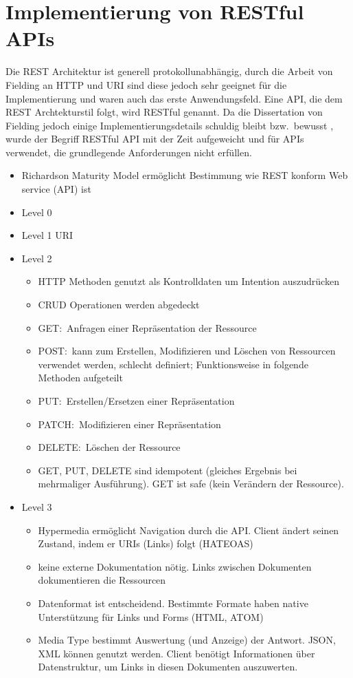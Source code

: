 \section{Implementierung von RESTful APIs}
Die REST Architektur ist generell protokollunabhängig, durch die Arbeit von Fielding an HTTP und URI sind diese jedoch sehr geeignet für die Implementierung und waren auch das erste Anwendungsfeld.\cite[vgl.][109,116]{REST}
Eine API, die dem REST Archtekturstil folgt, wird RESTful genannt.
Da die Dissertation von Fielding jedoch einige Implementierungsdetails schuldig bleibt bzw.\ bewusst , wurde der Begriff RESTful API mit der Zeit aufgeweicht und für APIs verwendet, die grundlegende Anforderungen nicht erfüllen.\cite[vgl.][]{fieldBlog}
\par
\begin{itemize}
  \item Richardson Maturity Model ermöglicht Bestimmung wie REST konform Web service (API) ist
  \item Level 0
  \item Level 1
  URI
  \item Level 2
  \begin{itemize}
    \item HTTP Methoden genutzt als Kontrolldaten um Intention auszudrücken
    \item CRUD Operationen werden abgedeckt
    \item GET:\ Anfragen einer Repräsentation der Ressource
    \item POST:\ kann zum Erstellen, Modifizieren und Löschen von Ressourcen verwendet werden, schlecht definiert; Funktionsweise in folgende Methoden aufgeteilt
    \item PUT:\ Erstellen/Ersetzen einer Repräsentation
    \item PATCH:\ Modifizieren einer Repräsentation
    \item DELETE:\ Löschen der Ressource
    \item GET, PUT, DELETE sind idempotent (gleiches Ergebnis bei mehrmaliger Ausführung). GET ist safe (kein Verändern der Ressource).
  \end{itemize}
  \item Level 3
  \begin{itemize}
    \item Hypermedia ermöglicht Navigation durch die API\@. Client ändert seinen Zustand, indem er URIs (Links) folgt (HATEOAS)
    \item keine externe Dokumentation nötig. Links zwischen Dokumenten dokumentieren die Ressourcen
    \item Datenformat ist entscheidend. Bestimmte Formate haben native Unterstützung für Links und Forms (HTML, ATOM)
    \item Media Type bestimmt Auswertung (und Anzeige) der Antwort. JSON, XML können genutzt werden. Client benötigt Informationen über Datenstruktur, um Links in diesen Dokumenten auszuwerten.
  \end{itemize}
\end{itemize}

